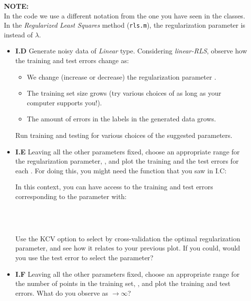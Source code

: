 \documentclass[DIN, pagenumber=false, fontsize=11pt, parskip=half]{scrartcl}
\begin{document}
\begin{framed}
\textbf{NOTE:} \\
In the code we use a different notation from the one you have seen in the classes. In the \emph{Regularized Least Squares} method (\texttt{rls.m}), the regularization parameter is  instead of $\lambda$.
\end{framed}
\begin{itemize}

	\item \textbf{I.D} Generate noisy data of \emph{Linear} type. Considering \emph{linear-RLS}, observe how the training and test errors change as:

\begin{itemize}
  \item We change (increase or decrease) the regularization parameter .
  \item The training set size grows (try various choices of  as long as your computer supports you!).
  \item The amount of errors in the labels in the generated data grows.
\end{itemize}
Run training and testing for various choices of the suggested parameters.

	\item \textbf{I.E} Leaving all the other parameters fixed, choose an appropriate range for the regularization parameter, , and plot the training and the test errors for each .
For doing this, you might need the function  that you saw in I.C:


In this context, you can have access to the training and test errors corresponding to the parameter  with:

\\
\\



	Use the KCV option to select by cross-validation the optimal regularization parameter, and see how it relates to your previous plot.
	If you could, would you use the test error to select the parameter?

	\item \textbf{I.F} Leaving all the other parameters fixed, choose an appropriate range for the number of points in the training set, \mcode{nval=[n\_min:} \mcode{n\_step:n\_max]},  and plot the training and test errors.
	 What do you observe as  $\rightarrow \infty$?
\end{itemize}
\end{document}
